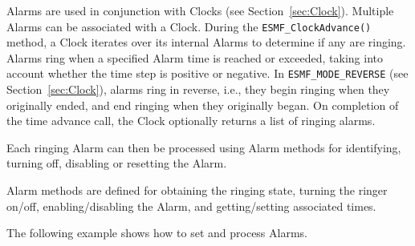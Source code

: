 
Alarms are used in conjunction with Clocks (see Section~\ref{sec:Clock}).
Multiple Alarms can be associated with a Clock.  During the
{\tt ESMF\_ClockAdvance()} method, a Clock iterates over its internal Alarms
to determine if any are ringing.  Alarms ring when a specified Alarm 
time is reached or exceeded, taking into account whether the time step is
positive or negative.  In {\tt ESMF\_MODE\_REVERSE}
(see Section~\ref{sec:Clock}), alarms ring in reverse, i.e., they begin
ringing when they originally ended, and end ringing when they originally
began.  On completion of the time advance call, the Clock optionally returns
a list of ringing alarms.

Each ringing Alarm can then be processed using Alarm methods for identifying,
turning off, disabling or resetting the Alarm.

Alarm methods are defined for obtaining the ringing state, turning the
ringer on/off, enabling/disabling the Alarm, and getting/setting 
associated times.

The following example shows how to set and process Alarms.
